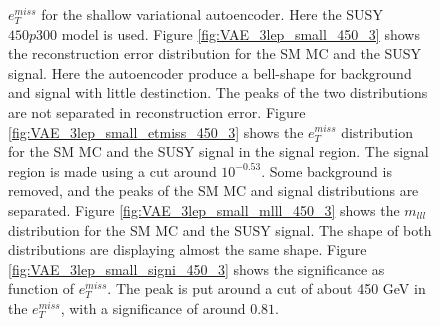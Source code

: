 \begin{figure}[H]
{    $e_T^{miss}$ for the shallow variational autoencoder. Here the SUSY $450p300$ model is used. 
    Figure \ref{fig:VAE_3lep_small_450_3} shows the reconstruction error 
    distribution for the SM MC and the SUSY signal. Here the autoencoder produce a bell-shape for background and 
    signal with little destinction. The peaks of the two distributions are not separated in reconstruction error. Figure \ref{fig:VAE_3lep_small_etmiss_450_3} 
    shows the $e_T^{miss}$ distribution for the SM MC and the SUSY signal in the signal region. 
    The signal region is made using a cut around $10^{-0.53}$. Some background is removed, and the peaks of the SM MC and signal 
    distributions are separated. Figure \ref{fig:VAE_3lep_small_mlll_450_3} shows the $m_{lll}$ distribution for the SM MC and the SUSY signal. 
    The shape of both distributions are displaying almost the same shape. Figure \ref{fig:VAE_3lep_small_signi_450_3} shows the significance as 
    function of $e_T^{miss}$. The peak is put around a cut of about 450 GeV in the $e_T^{miss}$, with a significance of around $0.81$.}
    \label{fig:VAE_3lep_small_rec_sig_signi_450_3}
\end{figure}








